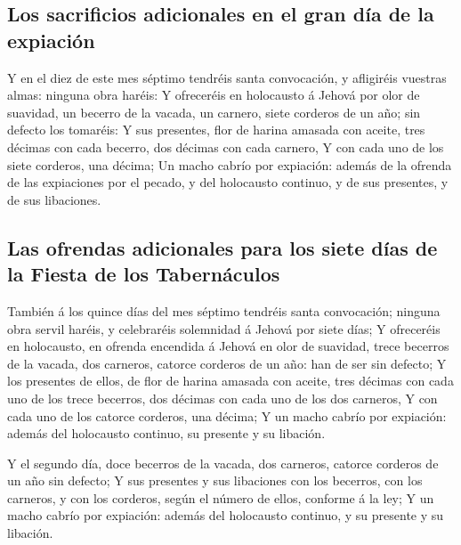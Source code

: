 \hypertarget{los-sacrificios-adicionales-en-el-gran-duxeda-de-la-expiaciuxf3n}{%
\subsection{Los sacrificios adicionales en el gran día de la
expiación}\label{los-sacrificios-adicionales-en-el-gran-duxeda-de-la-expiaciuxf3n}}

 Y en el diez de este mes séptimo tendréis santa
convocación, y afligiréis vuestras almas: ninguna obra haréis:
 Y ofreceréis en holocausto á Jehová por olor de suavidad,
un becerro de la vacada, un carnero, siete corderos de un año; sin
defecto los tomaréis:  Y sus presentes, flor de harina
amasada con aceite, tres décimas con cada becerro, dos décimas con cada
carnero,  Y con cada uno de los siete corderos, una
décima;  Un macho cabrío por expiación: además de la
ofrenda de las expiaciones por el pecado, y del holocausto continuo, y
de sus presentes, y de sus libaciones.

\hypertarget{las-ofrendas-adicionales-para-los-siete-duxedas-de-la-fiesta-de-los-tabernuxe1culos}{%
\subsection{Las ofrendas adicionales para los siete días de la Fiesta de
los
Tabernáculos}\label{las-ofrendas-adicionales-para-los-siete-duxedas-de-la-fiesta-de-los-tabernuxe1culos}}

 También á los quince días del mes séptimo tendréis santa
convocación; ninguna obra servil haréis, y celebraréis solemnidad á
Jehová por siete días;  Y ofreceréis en holocausto, en
ofrenda encendida á Jehová en olor de suavidad, trece becerros de la
vacada, dos carneros, catorce corderos de un año: han de ser sin
defecto;  Y los presentes de ellos, de flor de harina
amasada con aceite, tres décimas con cada uno de los trece becerros, dos
décimas con cada uno de los dos carneros,  Y con cada uno
de los catorce corderos, una décima;  Y un macho cabrío
por expiación: además del holocausto continuo, su presente y su
libación.

 Y el segundo día, doce becerros de la vacada, dos
carneros, catorce corderos de un año sin defecto;  Y sus
presentes y sus libaciones con los becerros, con los carneros, y con los
corderos, según el número de ellos, conforme á la ley;  Y
un macho cabrío por expiación: además del holocausto continuo, y su
presente y su libación.


